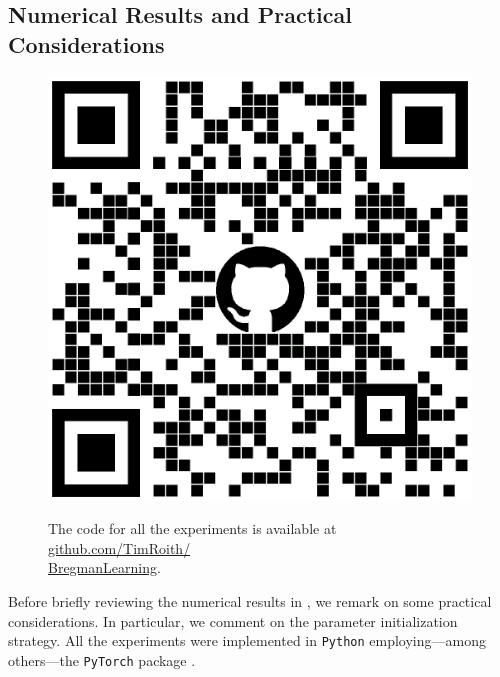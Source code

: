 \subsection{Numerical Results and Practical Considerations}\label{sec:Bregnum}
%
%
\begin{figure}
\begin{center}
\includegraphics[width=.4\textwidth]{atelier/Breg_dist/BregQR.png}
\end{center}
The code for all the experiments is available at \href{https://github.com/TimRoith/BregmanLearning}{github.com/TimRoith/}\\
\href{https://github.com/TimRoith/BregmanLearning}{BregmanLearning}.
\end{figure}
Before briefly reviewing the numerical results in \cite[Sec. 4]{bungert2022bregman}, we remark on some practical considerations. In particular, we comment on the parameter initialization strategy. All the experiments were implemented in \texttt{Python} \cite{van1995python} employing---among others---the \texttt{PyTorch} package \cite{paszke2019pytorch}.
%
